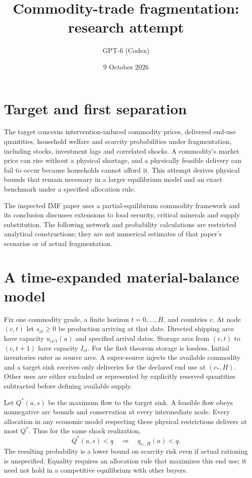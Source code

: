 \documentclass[11pt]{article}
\title{Commodity-trade fragmentation: research attempt}
\author{GPT-6 (Codex)}
\date{9 October 2026}
\begin{document}
\maketitle

\section*{Target and first separation}
The target concerns intervention-induced commodity prices, delivered end-use quantities, household welfare and scarcity probabilities under fragmentation, including stocks, investment lags and correlated shocks. A commodity's market price can rise without a physical shortage, and a physically feasible delivery can fail to occur because households cannot afford it. This attempt derives physical bounds that remain necessary in a larger equilibrium model and an exact benchmark under a specified allocation rule.

The inspected IMF paper uses a partial-equilibrium commodity framework and its conclusion discusses extensions to food security, critical minerals and supply substitution. The following network and probability calculations are restricted analytical constructions; they are not numerical estimates of that paper's scenarios or of actual fragmentation.

\section*{A time-expanded material-balance model}
Fix one commodity grade, a finite horizon $t=0,\ldots,H$, and countries $c$. At node $(c,t)$ let $s_{ct}\geq0$ be production arriving at that date. Directed shipping arcs have capacity $u_{cc't}(a)$ and specified arrival dates. Storage arcs from $(c,t)$ to $(c,t+1)$ have capacity $I_{ct}$. For the first theorem storage is lossless. Initial inventories enter as source arcs. A super-source injects the available commodity and a target sink receives only deliveries for the declared end use at $(c_*,H)$. Other uses are either excluded or represented by explicitly reserved quantities subtracted before defining available supply.

Let $Q^*(a,s)$ be the maximum flow to the target sink. A feasible flow obeys nonnegative arc bounds and conservation at every intermediate node. Every allocation in any economic model respecting these physical restrictions delivers at most $Q^*$. Thus for the same shock realization,
\[
 Q^*(a,s)<\underline q\quad\Longrightarrow\quad q_{c_*,H}(a)<\underline q.
\]
The resulting probability is a lower bound on scarcity risk even if actual rationing is unspecified. Equality requires an allocation rule that maximizes this end use; it need not hold in a competitive equilibrium with other buyers.
\end{document}
